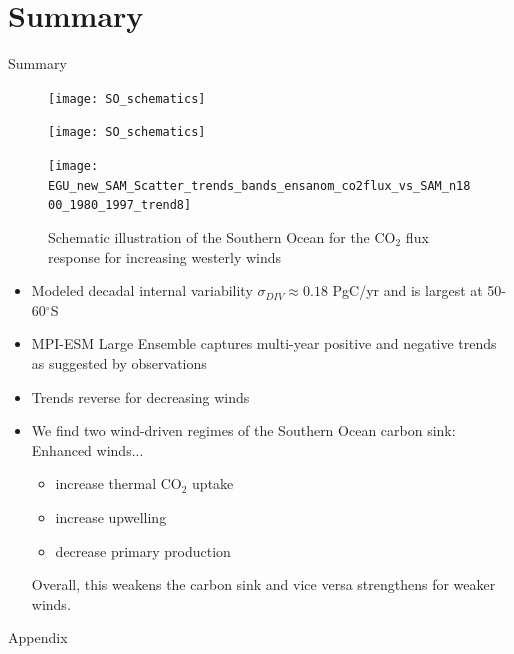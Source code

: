 \documentclass[aspectratio=169]{beamer}
\begin{document}
\section{Summary}
\begin{frame}{Summary}
	\begin{minipage}{.23\textwidth}
		
		\begin{figure}[h!]
			\centering
			
			\texttt{[image: SO\_schematics]}
			
			\texttt{[image: SO\_schematics]}
			
			\texttt{[image: EGU\_new\_SAM\_Scatter\_trends\_bands\_ensanom\_co2flux\_vs\_SAM\_n1800\_1980\_1997\_trend8]}
			
			\caption{Schematic illustration of the Southern Ocean for the CO$_2$ flux response for increasing westerly winds}
			\label{fig:schematics_neg}
		\end{figure}		
	
		
	\end{minipage} \hfill
	\begin{minipage}{.75\textwidth}
	\vspace{-30mm}
\begin{itemize}[<+->]
\item Modeled decadal internal variability $\sigma_{DIV}\approx 0.18$ PgC/yr and is largest at 50-60$^\circ$S
\item MPI-ESM Large Ensemble captures multi-year positive and negative trends as suggested by observations
\item Trends reverse for decreasing winds
\item We find two wind-driven regimes of the Southern Ocean carbon sink: Enhanced winds... 
\begin{itemize}
\item increase thermal CO$_2$ uptake
\item increase upwelling
\item decrease primary production
\end{itemize}

Overall, this weakens the carbon sink and vice versa strengthens for weaker winds.

\end{itemize}
\end{minipage}

\end{frame}



\begin{frame}{Appendix}
\addtocounter{framenumber}{-1}
\end{frame}
\end{document}
